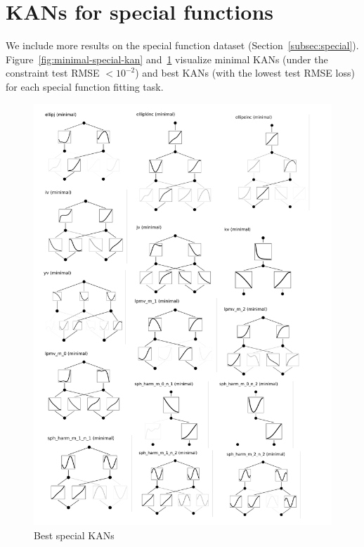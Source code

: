 \documentclass{article}
\numberwithin{equation}{section}
\numberwithin{figure}{section}
\begin{document}
\section{KANs for special functions}\label{app:special_kans}

We include more results on the special function dataset (Section~\ref{subsec:special}). Figure~\ref{fig:minimal-special-kan} and~\ref{fig:best-special-kan} visualize minimal KANs (under the constraint test RMSE $<10^{-2}$) and best KANs (with the lowest test RMSE loss) for each special function fitting task.

\begin{figure}[t]
    \centering
    \includegraphics[width=1\linewidth]{figs/best_special_kan.pdf}
    \caption{Best special KANs}
    \label{fig:best-special-kan}
\end{figure}
\end{document}
